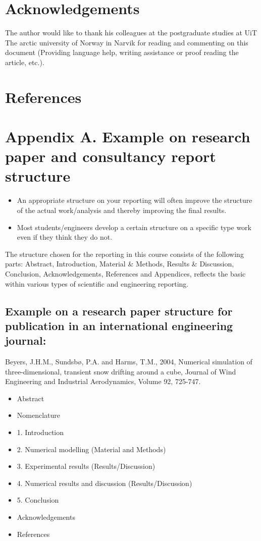 \documentclass[a4paper,12pt]{extarticle}
\begin{document}
\section{Acknowledgements}
The author would like to thank his colleagues at the postgraduate studies at UiT The arctic university of Norway in Narvik for reading and commenting on this document (Providing language help, writing assistance or proof reading the article, etc.).

\section{References}
\begingroup
\def\section*#1{}


\endgroup

\pagebreak
\appendix
\section{Appendix A. Example on research paper and consultancy report structure}
\begin{itemize}
  \item An appropriate structure on your reporting will often improve the structure of the actual work/analysis and thereby improving the final results.
  \item Most students/engineers develop a certain structure on a specific type work even if they think they do not.
\end{itemize}

The structure chosen for the reporting in this course consists of the following parts: Abstract, Introduction, Material \& Methods, Results \& Discussion, Conclusion, Acknowledgements, References and Appendices, reflects the basic within various types of scientific and engineering reporting. 

\subsection{Example on a research paper structure for publication in an international engineering journal:}
Beyers, J.H.M., Sundsbø, P.A. and Harms, T.M., 2004, Numerical simulation of three-dimensional, transient snow drifting around a cube, Journal of Wind Engineering and Industrial Aerodynamics, Volume 92, 725-747.

\begin{itemize}
  \item Abstract
  \item Nomenclature
  \item 1. Introduction
  \item 2. Numerical modelling (Material and Methods)
  \item 3. Experimental results (Results/Discussion)
  \item 4. Numerical results and discussion (Results/Discussion)
  \item 5. Conclusion
  \item Acknowledgements
  \item References
\end{itemize}
\end{document}
